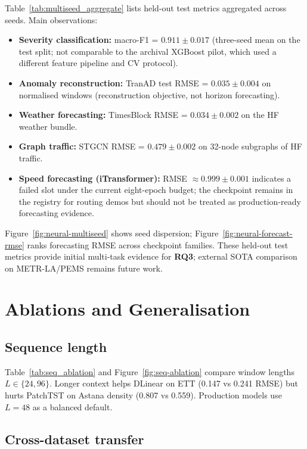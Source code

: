Table~\ref{tab:multiseed_aggregate} lists held-out test metrics aggregated across seeds. Main observations:
\begin{itemize}
  \item \textbf{Severity classification:} macro-F1 = $0.911 \pm 0.017$ (three-seed mean on the test split; not comparable to the archival XGBoost pilot, which used a different feature pipeline and CV protocol).
  \item \textbf{Anomaly reconstruction:} TranAD test RMSE = $0.035 \pm 0.004$ on normalised windows (reconstruction objective, not horizon forecasting).
  \item \textbf{Weather forecasting:} TimesBlock RMSE = $0.034 \pm 0.002$ on the HF weather bundle.
  \item \textbf{Graph traffic:} STGCN RMSE = $0.479 \pm 0.002$ on 32-node subgraphs of HF traffic.
  \item \textbf{Speed forecasting (iTransformer):} RMSE $\approx 0.999 \pm 0.001$ indicates a failed slot under the current eight-epoch budget; the checkpoint remains in the registry for routing demos but should not be treated as production-ready forecasting evidence.
\end{itemize}

Figure~\ref{fig:neural-multiseed} shows seed dispersion; Figure~\ref{fig:neural-forecast-rmse} ranks forecasting RMSE across checkpoint families. These held-out test metrics provide initial multi-task evidence for \textbf{RQ3}; external SOTA comparison on METR-LA/PEMS remains future work.



\section{Ablations and Generalisation}
\label{sec:ablations}

\subsection{Sequence length}

Table~\ref{tab:seq_ablation} and Figure~\ref{fig:seq-ablation} compare window lengths $L\in\{24,96\}$. Longer context helps DLinear on ETT (0.147 vs 0.241 RMSE) but hurts PatchTST on Astana density (0.807 vs 0.559). Production models use $L=48$ as a balanced default.

\subsection{Cross-dataset transfer}

